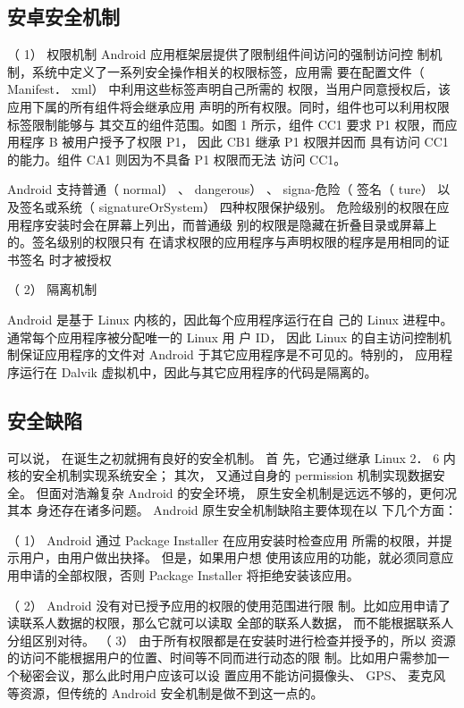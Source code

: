 \documentclass{article}
\begin{document}
\subsection{安卓安全机制}

（ 1） 权限机制
Android 应用框架层提供了限制组件间访问的强制访问控 制机制，系统中定义了一系列安全操作相关的权限标签，应用需 要在配置文件（ Manifest． xml） 中利用这些标签声明自己所需的 权限，当用户同意授权后，该应用下属的所有组件将会继承应用 声明的所有权限。同时，组件也可以利用权限标签限制能够与 其交互的组件范围。如图 1 所示，组件 CC1 要求 P1 权限，而应 用程序 B 被用户授予了权限 P1， 因此 CB1 继承 P1 权限并因而 具有访问 CC1 的能力。组件 CA1 则因为不具备 P1 权限而无法 访问 CC1。

Android 支持普通（ normal） 、 dangerous） 、 signa-危险（ 签名（ ture） 以及签名或系统（ signatureOrSystem） 四种权限保护级别。 危险级别的权限在应用程序安装时会在屏幕上列出，而普通级 别的权限是隐藏在折叠目录或屏幕上的。签名级别的权限只有 在请求权限的应用程序与声明权限的程序是用相同的证书签名 时才被授权

（ 2） 隔离机制

Android 是基于 Linux 内核的，因此每个应用程序运行在自 己的 Linux 进程中。通常每个应用程序被分配唯一的 Linux 用 户 ID， 因此 Linux 的自主访问控制机制保证应用程序的文件对 Android 于其它应用程序是不可见的。特别的， 应用程序运行在 Dalvik 虚拟机中，因此与其它应用程序的代码是隔离的。

\subsection{安全缺陷}

可以说， 在诞生之初就拥有良好的安全机制。 首 先，它通过继承 Linux 2． 6 内核的安全机制实现系统安全； 其次， 又通过自身的 permission 机制实现数据安全。 但面对浩瀚复杂 Android 的安全环境， 原生安全机制是远远不够的，更何况其本 身还存在诸多问题。 Android 原生安全机制缺陷主要体现在以 下几个方面：

（ 1） Android 通过 Package Installer 在应用安装时检查应用 所需的权限，并提示用户，由用户做出抉择。 但是，如果用户想 使用该应用的功能，就必须同意应用申请的全部权限，否则 Package Installer 将拒绝安装该应用。

（ 2） Android 没有对已授予应用的权限的使用范围进行限 制。比如应用申请了读联系人数据的权限，那么它就可以读取
全部的联系人数据， 而不能根据联系人分组区别对待。 （ 3） 由于所有权限都是在安装时进行检查并授予的，所以 资源的访问不能根据用户的位置、时间等不同而进行动态的限 制。比如用户需参加一个秘密会议，那么此时用户应该可以设 置应用不能访问摄像头、 GPS、 麦克风等资源，但传统的 Android 安全机制是做不到这一点的。
\end{document}
